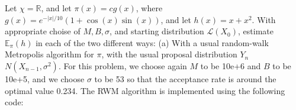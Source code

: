 
Let $\chi = \mathbb{R}$, and let $\pi(x)=cg(x)$, where $g(x)=e^{-|x|/10}(1+\cos(x)\sin(x))$, and let $h(x)=x+x^2$. With appropriate choise of $M,B, \sigma$, and starting distribution $\mathcal{L}(X_0)$, estimate $\mathbb{E}_\pi(h)$ in each of the two different ways:
(a) With a usual random-walk Metropolis algorithm for $\pi$, with the usual proposal distribution $Y_n$~$N(X_{n-1},\sigma^2)$.
For this problem, we choose again $M$ to be 10e+6 and $B$ to be 10e+5, and we choose $\sigma$ to be 53 so that the acceptance rate is around the optimal value 0.234.
The RWM algorithm is implemented using the following code:
\begin{knitrout}
\color{fgcolor}\begin{kframe}
\begin{alltt}

 \hlkwb{=} \hlstd{(}\hlopt{+}\hlopt{^}\hlstd{\}}
 \hlkwb{=} \hlstd{(}\hlstd{) \{}\hlstd{(}\hlopt{-}\hlopt{/}\hlstd{)}\hlopt{*}\hlstd{(}\hlopt{+}\hlopt{*}\hlopt{^}\hlstd{))\}}

 \hlkwb{=} 
 \hlkwb{=} 
 \hlkwb{=} 

 \hlkwb{=} \hlopt{+}
 \hlkwb{=} \hlopt{+}
 \hlkwb{=} \hlstd{(}
 \hlkwb{=} 

   \hlopt{:}\hlopt{+}
   \hlkwb{=} \hlstd{(}\hlstd{,}

   \hlstd{(}\hlstd{(}\hlstd{)}\hlopt{<=}\hlopt{+}\hlopt{/}
     \hlopt{>}
      \hlkwb{=}\hlopt{+}
     \hlkwb{=} \hlopt{+}
  \hlstd{\}}
   \hlkwb{=} 
   \hlkwb{=} 
\hlstd{\}}


\end{alltt}
\end{kframe}
\end{knitrout}
